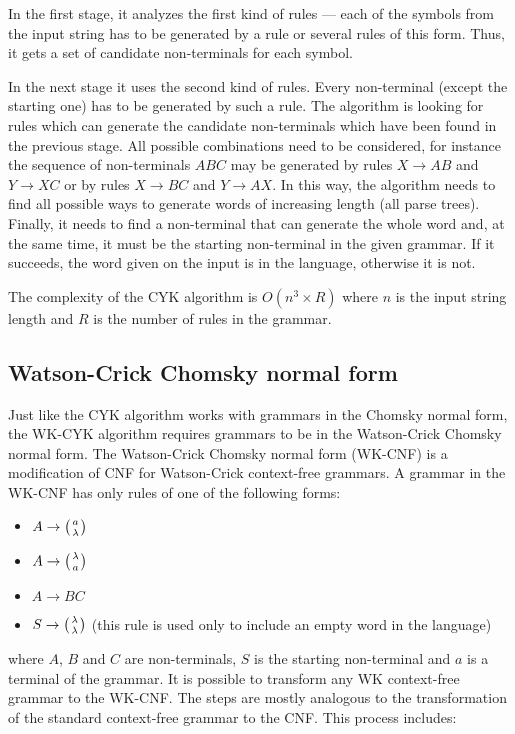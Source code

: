 In the first stage, it analyzes the first kind of rules --- each of the symbols from the input string has to be generated by a rule or several rules of this form. Thus, it gets a set of candidate non-terminals for each symbol.

In the next stage it uses the second kind of rules. Every non-terminal (except the starting one) has to be generated by such a rule.
The algorithm is looking for rules which can generate the candidate non-terminals which have been found in the previous stage. All possible combinations need to be considered, for instance the sequence of non-terminals $ABC$ may be generated by rules $X \rightarrow AB$ and $Y \rightarrow XC$ or by rules $X \rightarrow BC$ and $Y \rightarrow AX$. In this way, the algorithm needs to find all possible ways to generate words of increasing length (all parse trees). Finally, it needs to find a non-terminal that can generate the whole word and, at the same time, it must be the starting non-terminal in the given grammar. If it succeeds, the word given on the input is in the language, otherwise it is not.

The complexity of the CYK algorithm is $O(n^3 \times R)$ where $n$ is the input string length and $R$ is the number of rules in the grammar.

\subsection{Watson-Crick Chomsky normal form}
Just like the CYK algorithm works with grammars in the Chomsky normal form, the WK-CYK algorithm requires grammars to be in the Watson-Crick Chomsky normal form. The Watson-Crick Chomsky normal form (WK-CNF) is a modification of CNF for Watson-Crick context-free grammars. A grammar in the WK-CNF has only rules of one of the following forms:

\begin{itemize}
  \item{$A \rightarrow \wkpair{a}{\lambda}$}
  \item{$A \rightarrow \wkpair{\lambda}{a}$}
  \item{$A \rightarrow B C$}
  \item{$S \rightarrow \wkpair{\lambda}{\lambda}$ (this rule is used only to include an empty word in the language)}
\end{itemize}

where $A$, $B$ and $C$ are non-terminals, $S$ is the starting non-terminal and $a$ is a terminal of the grammar. It is possible to transform any WK context-free grammar to the WK-CNF. The steps are mostly analogous to the transformation of the standard context-free grammar to the CNF. This process includes:

